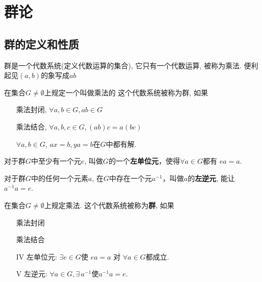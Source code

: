 \section{群论}

\subsection{群的定义和性质}

\begin{Remark}
群是一个代数系统(定义代数运算的集合), 它只有一个代数运算, 被称为乘法. 便利起见$(a, b)$的象写成$a b$ %
\end{Remark}

\begin{Definition}
在集合$G \neq \emptyset$上规定一个叫做乘法的\;\;%
这个代数系统被称为群, 如果
\begin{itemize}
	\item[\uppercase\expandafter{\romannumeral1}] 乘法封闭, $\forall a, b \in G, ab \in G$ %
	\item[\uppercase\expandafter{\romannumeral2}] 乘法结合, $\forall a, b, c \in G, (ab)c = a(bc)$
	\item[\uppercase\expandafter{\romannumeral3}] $ \forall a, b \in G$, $ax = b, ya = b$在$G$中都有解.
\end{itemize}
\end{Definition}

\begin{Theorem}[左单位元]
对于群$G$中至少有一个元$e$, 叫做$G$的一个\textbf{左单位元}，使得$\forall a \in G$都有 $ea = a$.
\end{Theorem}

\begin{Theorem}[左逆元]
对于群$G$中的任何一个元素$a$, 在$G$中存在一个元$a^{-1}$，叫做$a$的\textbf{左逆元}, 能让$a^{-1} a = e$.
\end{Theorem}

\begin{Definition}
在集合$G \neq \emptyset$上规定乘法. 这个代数系统被称为\textbf{群}, 如果
\begin{itemize}
	\item[\uppercase\expandafter{\romannumeral1}] 乘法封闭
	\item[\uppercase\expandafter{\romannumeral2}] 乘法结合
	\item[IV] 左单位元: $\exists e \in G$使 $ea =a$ 对 $\forall a \in G$都成立.
	\item[V] 左逆元: $\forall a \in G, \exists \, a^{-1}$使$a^{-1}a = e$.
\end{itemize}
\end{Definition}

